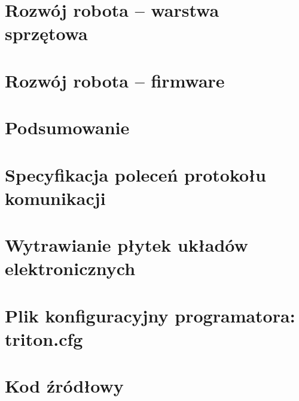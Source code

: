 \documentclass[a4paper,12pt, oneside]{mwbk}
\begin{document}
\newpage
\chapter{Rozwój robota -- warstwa sprzętowa}









\chapter{Rozwój robota -- firmware}





\newpage
\chapter*{Podsumowanie}


\newpage 
\appendix
\chapter{Specyfikacja poleceń protokołu komunikacji}

\chapter{Wytrawianie płytek układów elektronicznych}

\chapter{Plik konfiguracyjny programatora: triton.cfg}

\chapter*{Kod źródłowy}
%
\listoffigures
\listoftables

\newpage

{}


\newpage
\end{document}
